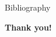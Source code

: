 \documentclass[unknownkeysallowed]{beamer}
\begin{document}
\begin{frame}{Bibliography}
\nocite{*}
\printbibliography
\end{frame}

\addtocounter{framenumber}{-1}
\begin{frame}[plain]{}
\begin{center}
    \LARGE\color{marron}
\textbf{Thank you!}
\end{center}
\end{frame}
\end{document}
